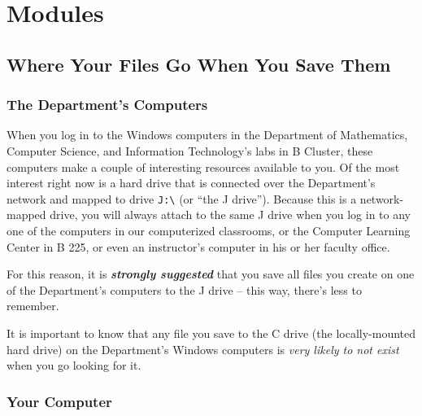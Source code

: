 
\chapter{Modules}
\label{day:modules}


\minitoc

\section{Where Your Files Go When You Save Them}

\subsection{The Department's Computers}

When you log in to the Windows computers in the Department of Mathematics, Computer Science, and Information Technology's labs in B Cluster, these computers make a couple of interesting resources available to you.  Of the most interest right now is a hard drive that is connected over the Department's network and mapped to drive \texttt{J:\textbackslash} (or ``the J drive'').  Because this is a network-mapped drive, you will always attach to the same J drive when you log in to any one of the computers in our computerized classrooms, or the Computer Learning Center in B 225, or even an instructor's computer in his or her faculty office.

For this reason, it is \textbf{\textit{strongly suggested}} that you save all files you create on one of the Department's computers to the J drive -- this way, there's less to remember.

It is important to know that any file you save to the C drive (the locally-mounted hard drive) on the Department's Windows computers is \textit{very likely to not exist} when you go looking for it.

\subsection{Your Computer}

